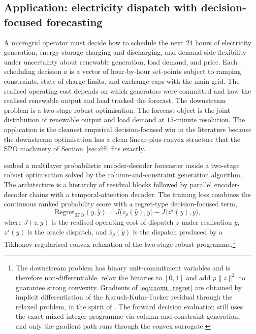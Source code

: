 \subsection{Application: electricity dispatch with decision-focused forecasting}
\label{sec:app_electricity}

A microgrid operator must decide how to schedule the next $24$ hours of
electricity generation, energy-storage charging and discharging, and
demand-side flexibility under uncertainty about renewable generation,
load demand, and price. Each scheduling decision $a$ is a vector of
hour-by-hour set-points subject to ramping constraints, state-of-charge
limits, and exchange caps with the main grid. The realised operating
cost depends on which generators were committed and how the realised
renewable output and load tracked the forecast. The downstream problem is
a two-stage robust optimisation. The forecast object is the joint
distribution of renewable output and load demand at $15$-minute
resolution. The application is the cleanest empirical
decision-focused win in the literature because the downstream
optimisation has a clean linear-plus-convex structure that the SPO
machinery of Section~\ref{sec:dfl} fits exactly.

\citet{CaoXu2025} embed a multilayer probabilistic encoder-decoder
forecaster inside a two-stage robust optimisation solved by the
column-and-constraint generation algorithm. The architecture is a
hierarchy of residual blocks followed by parallel encoder-decoder chains
with a temporal-attention decoder. The training loss combines the
continuous ranked probability score with a regret-type decision-focused
term,
\begin{equation}
\mathrm{Regret}_{\mathrm{SPO}}(y, \hat y)
= J\bigl(\bar z_\rho(\hat y), y\bigr) - J\bigl(z^\star(y), y\bigr),
\label{eq:caoxu_regret}
\end{equation}
where $J(z, y)$ is the realised operating cost of dispatch $z$ under
realisation $y$, $z^\star(y)$ is the oracle dispatch, and $\bar
z_\rho(\hat y)$ is the dispatch produced by a Tikhonov-regularised convex
relaxation of the two-stage robust programme.\footnote{The downstream
problem has binary unit-commitment variables and is therefore
non-differentiable. \citet{CaoXu2025} relax the binaries to $[0, 1]$ and
add $\rho \|z\|^2$ to guarantee strong convexity. Gradients of
\eqref{eq:caoxu_regret} are obtained by implicit differentiation of the
Karush-Kuhn-Tucker residual through the relaxed problem, in the spirit
of \citet{DontiAmosKolter2017}. The forward decision evaluation still uses
the exact mixed-integer programme via column-and-constraint generation,
and only the gradient path runs through the convex surrogate.}

